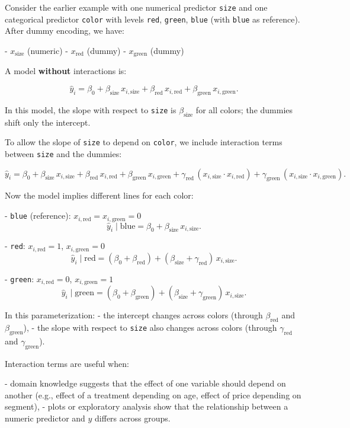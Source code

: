 Consider the earlier example with one numerical predictor \texttt{size} and one categorical predictor \texttt{color} with levels \texttt{red}, \texttt{green}, \texttt{blue} (with \texttt{blue} as reference). After dummy encoding, we have:

- $x_{\text{size}}$ (numeric)
- $x_{\text{red}}$ (dummy)
- $x_{\text{green}}$ (dummy)

A model \textbf{without} interactions is:

\[
\hat{y}_i
= \beta_0
+ \beta_{\text{size}} \, x_{i,\text{size}}
+ \beta_{\text{red}} \, x_{i,\text{red}}
+ \beta_{\text{green}} \, x_{i,\text{green}}.
\]

In this model, the slope with respect to \texttt{size} is $\beta_{\text{size}}$ for all colors; the dummies shift only the intercept.

To allow the slope of \texttt{size} to depend on \texttt{color}, we include interaction terms between \texttt{size} and the dummies:

\[
\hat{y}_i =
\beta_0
+ \beta_{\text{size}} \, x_{i,\text{size}}
+ \beta_{\text{red}} \, x_{i,\text{red}}
+ \beta_{\text{green}} \, x_{i,\text{green}}
+ \gamma_{\text{red}} \, (x_{i,\text{size}} \cdot x_{i,\text{red}})
+ \gamma_{\text{green}} \, (x_{i,\text{size}} \cdot x_{i,\text{green}}).
\]

Now the model implies different lines for each color:

- \texttt{blue} (reference): $x_{i,\text{red}} = x_{i,\text{green}} = 0$
  \[
  \hat{y}_i \mid \text{blue}
  = \beta_0 + \beta_{\text{size}} \, x_{i,\text{size}}.
  \]

- \texttt{red}: $x_{i,\text{red}} = 1$, $x_{i,\text{green}} = 0$
  \[
  \hat{y}_i \mid \text{red}
  = (\beta_0 + \beta_{\text{red}})
  + (\beta_{\text{size}} + \gamma_{\text{red}})\, x_{i,\text{size}}.
  \]

- \texttt{green}: $x_{i,\text{red}} = 0$, $x_{i,\text{green}} = 1$
  \[
  \hat{y}_i \mid \text{green}
  = (\beta_0 + \beta_{\text{green}})
  + (\beta_{\text{size}} + \gamma_{\text{green}})\, x_{i,\text{size}}.
  \]

In this parameterization:
- the intercept changes across colors (through $\beta_{\text{red}}$ and $\beta_{\text{green}}$),
- the slope with respect to \texttt{size} also changes across colors (through $\gamma_{\text{red}}$ and $\gamma_{\text{green}}$).

Interaction terms are useful when:

- domain knowledge suggests that the effect of one variable should depend on another (e.g., effect of a treatment depending on age, effect of price depending on segment),  
- plots or exploratory analysis show that the relationship between a numeric predictor and $y$ differs across groups.

